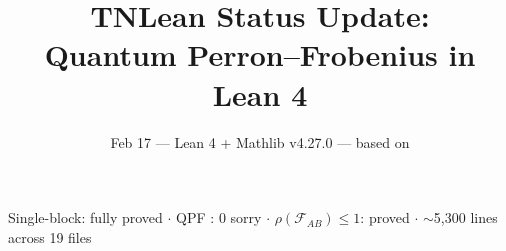 \documentclass[aspectratio=169,10pt]{beamer}
\title{\textbf{TNLean Status Update:\\Quantum Perron--Frobenius in Lean 4}}
\subtitle{{\small Feb 17 --- Lean 4 + Mathlib v4.27.0 --- based on \cite{Perez-Garcia2007Matrix,Wolf2012Quantum}}}
\date{}
\author{}
\begin{document}
{%
\begin{frame}
    \vspace{-1.5em}
    \maketitle
    \vspace{-3em}
    \begin{center}
        {\footnotesize
            \textcolor{dimwhite}{Single-block: \textcolor{leangreen}{fully proved} $\cdot$
            QPF \cite{Evans1978Spectral}: \textcolor{leangreen}{0 sorry} $\cdot$
            $\rho(\mathcal{F}_{AB}) \leq 1$: \textcolor{leangreen}{proved} $\cdot$
            ${\sim}$5{,}300 lines across 19 files}}
    \end{center}
\end{frame}
}
\end{document}
